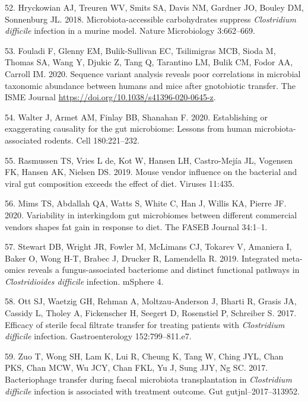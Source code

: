 \documentclass[
  11pt,
]{article}
\begin{document}
\leavevmode\hypertarget{ref-Hryckowian2018}{}%
52. Hryckowian AJ, Treuren WV, Smits SA, Davis NM, Gardner JO, Bouley
DM, Sonnenburg JL. 2018. Microbiota-accessible carbohydrates suppress
\emph{Clostridium difficile} infection in a murine model. Nature
Microbiology 3:662--669.

\leavevmode\hypertarget{ref-Fouladi2020}{}%
53. Fouladi F, Glenny EM, Bulik-Sullivan EC, Tsilimigras MCB, Sioda M,
Thomas SA, Wang Y, Djukic Z, Tang Q, Tarantino LM, Bulik CM, Fodor AA,
Carroll IM. 2020. Sequence variant analysis reveals poor correlations in
microbial taxonomic abundance between humans and mice after gnotobiotic
transfer. The ISME Journal
\url{https://doi.org/10.1038/s41396-020-0645-z}.

\leavevmode\hypertarget{ref-Walter2020}{}%
54. Walter J, Armet AM, Finlay BB, Shanahan F. 2020. Establishing or
exaggerating causality for the gut microbiome: Lessons from human
microbiota-associated rodents. Cell 180:221--232.

\leavevmode\hypertarget{ref-Rasmussen2019}{}%
55. Rasmussen TS, Vries L de, Kot W, Hansen LH, Castro-Mejía JL,
Vogensen FK, Hansen AK, Nielsen DS. 2019. Mouse vendor influence on the
bacterial and viral gut composition exceeds the effect of diet. Viruses
11:435.

\leavevmode\hypertarget{ref-Mims2020}{}%
56. Mims TS, Abdallah QA, Watts S, White C, Han J, Willis KA, Pierre JF.
2020. Variability in interkingdom gut microbiomes between different
commercial vendors shapes fat gain in response to diet. The FASEB
Journal 34:1--1.

\leavevmode\hypertarget{ref-Stewart2019}{}%
57. Stewart DB, Wright JR, Fowler M, McLimans CJ, Tokarev V, Amaniera I,
Baker O, Wong H-T, Brabec J, Drucker R, Lamendella R. 2019. Integrated
meta-omics reveals a fungus-associated bacteriome and distinct
functional pathways in \emph{Clostridioides difficile} infection.
mSphere 4.

\leavevmode\hypertarget{ref-Ott2017}{}%
58. Ott SJ, Waetzig GH, Rehman A, Moltzau-Anderson J, Bharti R, Grasis
JA, Cassidy L, Tholey A, Fickenscher H, Seegert D, Rosenstiel P,
Schreiber S. 2017. Efficacy of sterile fecal filtrate transfer for
treating patients with \emph{Clostridium difficile} infection.
Gastroenterology 152:799--811.e7.

\leavevmode\hypertarget{ref-Zuo2017}{}%
59. Zuo T, Wong SH, Lam K, Lui R, Cheung K, Tang W, Ching JYL, Chan PKS,
Chan MCW, Wu JCY, Chan FKL, Yu J, Sung JJY, Ng SC. 2017. Bacteriophage
transfer during faecal microbiota transplantation in \emph{Clostridium
difficile} infection is associated with treatment outcome. Gut
gutjnl--2017--313952.
\end{document}
